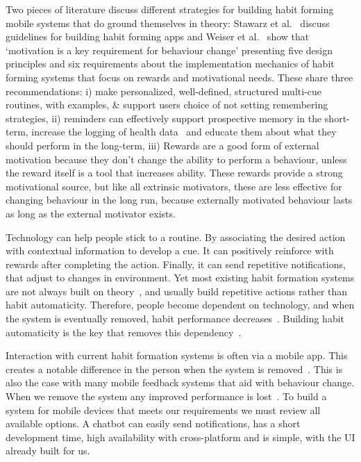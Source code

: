 \documentclass{scaffold/sigchi}
\begin{document}
Two pieces of literature discuss different strategies for building habit forming mobile systems that do ground themselves in theory: Stawarz et al.~\cite{article_beyond_self_tracking_designing_apps} discuss guidelines for building habit forming apps and Weiser et al.~\cite{article_taxonomy_motivational_affordances_meaningful} show that `motivation is a key requirement for behaviour change' presenting five design principles and six requirements about the implementation mechanics of habit forming systems that focus on rewards and motivational needs. These share three recommendations: i) make personalized, well-defined, structured multi-cue routines, with examples, \& support users choice of not setting remembering strategies, ii) reminders can effectively support prospective memory in the short-term, increase the logging of health data~\cite{the_power_of_logging_mobile_notifications} and educate them about what they should perform in the long-term, iii) Rewards are a good form of external motivation because they don't change the ability to perform a behaviour, unless the reward itself is a tool that increases ability. These rewards provide a strong motivational source, but like all extrinsic motivators, these are less effective for changing behaviour in the long run, because externally motivated behaviour lasts as long as the external motivator exists.

Technology can help people stick to a routine. By associating the desired action with contextual information to develop a cue. It can positively reinforce with rewards after completing the action. Finally, it can send repetitive notifications, that adjust to changes in environment.
Yet most existing habit formation systems are not always built on theory~\cite{article_beyond_self_tracking_designing_apps, article_dont_kick_habit}, and usually build repetitive actions rather than habit automaticity.
Therefore, people become dependent on technology, and when the system is eventually removed, habit performance decreases~\cite{}. Building habit automaticity is the key that removes this dependency~\cite{article_beyond_self_tracking_designing_apps}.

Interaction with current habit formation systems is often via a mobile app. This creates a notable difference in the person when the system is removed~\cite{article_my_phone_is_part_of_my_soul}.
This is also the case with many mobile feedback systems that aid with behaviour change.
When we remove the system any improved performance is lost~\cite{article_dont_kick_habit, article_realtime_feedback_improving_medication_taking}. To build a system for mobile devices that meets our requirements we must review all available options. A chatbot can easily send notifications, has a short development time, high availability with cross-platform and is simple, with the UI already built for us.
\end{document}
